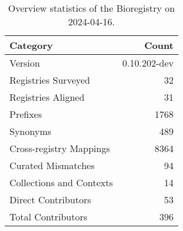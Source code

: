 \begin{table}
\caption{Overview statistics of the Bioregistry on 2024-04-16.}
\label{tab:bioregistry-summary}
\begin{tabular}{lr}
\toprule
Category & Count \\
\midrule
Version & 0.10.202-dev \\
Registries Surveyed & 32 \\
Registries Aligned & 31 \\
Prefixes & 1768 \\
Synonyms & 489 \\
Cross-registry Mappings & 8364 \\
Curated Mismatches & 94 \\
Collections and Contexts & 14 \\
Direct Contributors & 53 \\
Total Contributors & 396 \\
\bottomrule
\end{tabular}
\end{table}
